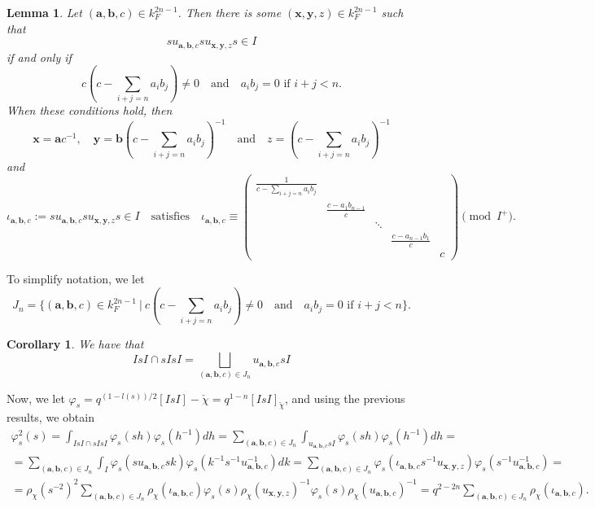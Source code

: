 \documentclass{article}
\theoremstyle{plain}
\newtheorem{lemma}[theorem]{Lemma}
\newtheorem{cor}[theorem]{Corollary}
\theoremstyle{definition}
\begin{document}
    \begin{lemma}
        Let $(\mathbf{a},\mathbf{b},c)\in k_F^{2n-1}$. Then there is some $(\mathbf{x},\mathbf{y},z)\in k_F^{2n-1}$ such that 
        $$su_{\mathbf{a},\mathbf{b},c}su_{\mathbf{x},\mathbf{y},z}s\in I$$
        if and only if 
        \begin{equation*}
        c(c-\sum_{i+j=n}a_ib_j)\neq0\quad\text{and}\quad a_ib_j=0 \text{  if  } i+j<n.
        \end{equation*}
        When these conditions hold, then 
        $$\mathbf{x}=\mathbf{a}c^{-1},\quad \mathbf{y}=\mathbf{b}(c-\sum_{i+j=n}a_ib_j)^{-1}\quad\text{and}\quad z=(c-\sum_{i+j=n}a_ib_j)^{-1}$$
        and 
        \begin{equation}
            \iota_{\mathbf{a},\mathbf{b},c}:=su_{\mathbf{a},\mathbf{b},c}su_{\mathbf{x},\mathbf{y},z}s\in I\quad\text{satisfies}\quad \iota_{\mathbf{a},\mathbf{b},c}\equiv
            \begin{pmatrix}
                \frac{1}{c-\sum_{i+j=n}a_ib_j}&&&& \\
                &\frac{c-a_1b_{n-1}}{c}&&& \\
                &&\ddots&& \\
                &&&\frac{c-a_{n-1}b_1}{c}& \\
                &&&&c
            \end{pmatrix}
            \pmod{I^+}.
        \end{equation}
    \end{lemma}
    To simplify notation, we let $$J_n=\{(\mathbf{a},\mathbf{b},c)\in k_F^{2n-1}\ |\ c(c-\sum_{i+j=n}a_ib_j)\neq0\quad\text{and}\quad a_ib_j=0 \text{  if  } i+j<n\}.$$
    \begin{cor}\label{cor_sIsI}
        We have that
        $$IsI\cap sIsI=\bigsqcup_{(\mathbf{a},\mathbf{b},c)\in J_n}u_{\mathbf{a},\mathbf{b},c}sI$$
    \end{cor}

    Now, we let $\varphi_s=q^{(1-l(s))/2}[IsI]-{\check{\chi}}=q^{1-n}[IsI]_{\check{\chi}}$, and using the previous results, we obtain
    \begin{align*}
        \varphi_s^2(s)=\int_{IsI\cap sIsI}\varphi_s(sh)\varphi_s(h^{-1})dh=\sum_{(\mathbf{a},\mathbf{b},c)\in J_n}\int_{u_{\mathbf{a},\mathbf{b},c}sI}\varphi_s(sh)\varphi_s(h^{-1})dh=\\
        =\sum_{(\mathbf{a},\mathbf{b},c)\in J_n}\int_{I}\varphi_s(su_{\mathbf{a},\mathbf{b},c}sk)\varphi_s(k^{-1}s^{-1}u_{\mathbf{a},\mathbf{b},c}^{-1})dk=\sum_{(\mathbf{a},\mathbf{b},c)\in J_n}\varphi_s(\iota_{\mathbf{a},\mathbf{b},c}s^{-1}u_{\mathbf{x},\mathbf{y},z})\varphi_s(s^{-1}u_{\mathbf{a},\mathbf{b},c}^{-1})=\\
        =\rho_\chi(s^{-2})^2\sum_{(\mathbf{a},\mathbf{b},c)\in J_n}\rho_\chi(\iota_{\mathbf{a},\mathbf{b},c})\varphi_s(s)\rho_\chi(u_{\mathbf{x},\mathbf{y},z})^{-1}\varphi_s(s)\rho_\chi(u_{\mathbf{a},\mathbf{b},c})^{-1}=q^{2-2n}\sum_{(\mathbf{a},\mathbf{b},c)\in J_n}\rho_\chi(\iota_{\mathbf{a},\mathbf{b},c}).
    \end{align*}
\end{document}

